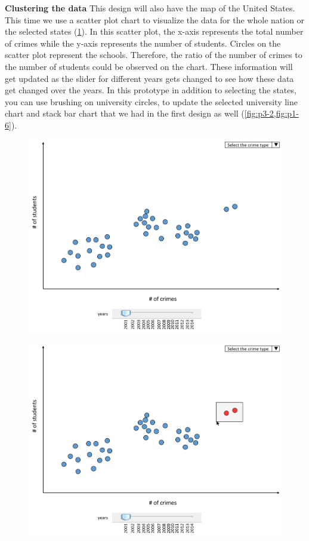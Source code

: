 \documentclass[12pt]{article}
\begin{document}
\noindent
\textbf{Clustering the data} This design will also have the map of the United States. This time we use a scatter plot chart to visualize the data for the whole nation or the selected states (\cref{fig:p3-1}). In this scatter plot, the x-axis represents the total number of crimes while the y-axis represents the number of students. Circles on the scatter plot represent the schools. Therefore, the ratio of the number of crimes to the number of students could be observed on the chart. These information will get updated as the slider for different years gets changed to see how these data get changed over the years. In this prototype in addition to selecting the states, you can use brushing on university circles, to update the selected university line chart and stack bar chart that we had in the first design as well (\cref{fig:p3-2,fig:p1-6}). 
\\

\begin{figure}[tbph]
   \centering{}
	       \includegraphics[width=6in]{prot3}           
\caption{}
\label{fig:p3-1}
\end{figure}

\begin{figure}[tbph]
   \centering{}
	       \includegraphics[width=6in]{prot3-2}           
\caption{}
\label{fig:p3-2}
\end{figure}
\end{document}
